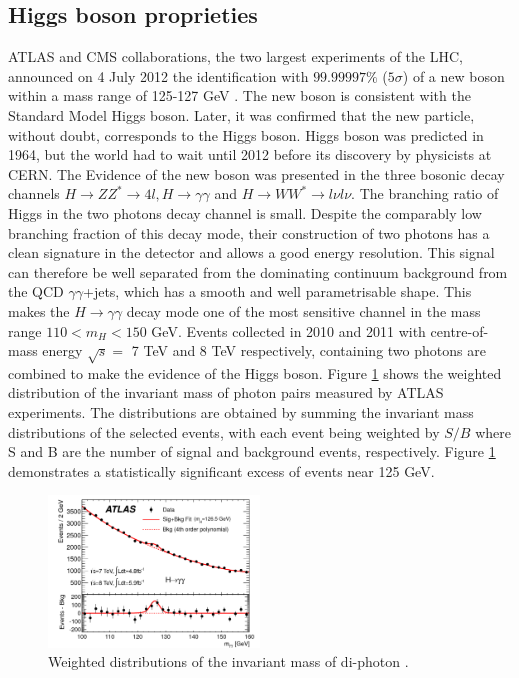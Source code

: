 \subsection{Higgs boson proprieties}
\label{chap1:H2012:HM}
ATLAS and CMS collaborations, the two largest experiments of the LHC, announced on 4 July 2012 the identification with $99.99997\%$ ($5\sigma$) of a new boson within a mass range of 125-127 GeV \cite{ATLAS_2012, CMS_2012}. The new boson is consistent with the Standard Model Higgs boson. Later, it was confirmed that the new particle, without doubt, corresponds to the Higgs boson. Higgs boson was predicted in 1964, but the world had to wait until 2012 before its discovery by physicists at CERN. The Evidence of the new boson was presented in the three bosonic decay channels $H\rightarrow ZZ^* \rightarrow 4l, H\rightarrow\gamma\gamma$ and $H\rightarrow WW^*\rightarrow l\nu l\nu$. The branching ratio of Higgs in the two photons decay channel is small. Despite the comparably low branching fraction of this decay mode, their construction of two photons has a clean signature in the detector and allows a good energy resolution. This signal can therefore be well separated from the dominating continuum background from the QCD $\gamma\gamma$+jets, which has a smooth and well parametrisable shape. This makes the $H\rightarrow\gamma\gamma$ decay mode one of the most sensitive channel in the mass range $110 < m_{H} < 150$ GeV. Events collected in 2010 and 2011 with centre-of-mass energy $\sqrt{s}=$ 7 TeV and 8 TeV respectively, containing two photons are combined to make the evidence of the Higgs boson. Figure \ref{fig:chap1:H2012:Hyy} shows the weighted distribution of the invariant mass of photon pairs measured by ATLAS experiments. The distributions are obtained by summing the invariant mass distributions of the selected events, with each event being weighted by $S/B$ where S and B are the number of signal and background events, respectively. Figure \ref{fig:chap1:H2012:Hyy} demonstrates a statistically significant excess of events near 125 GeV. \\
\begin{figure}[htbp]
    \centering
    \includegraphics[width=0.5\textwidth]{Ch1/Img/Hmyy.png}
    \caption{Weighted distributions of the invariant mass of di-photon \cite{ATLAS_2012}.}
    \label{fig:chap1:H2012:Hyy}
\end{figure}
